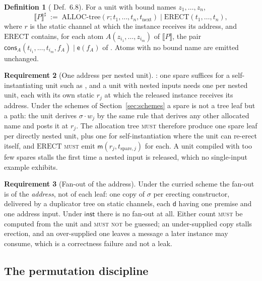 \documentclass[11pt,a4paper]{article}
\newcommand{\MUST}{\textsc{must}}
\newcommand{\MUSTNOT}{\textsc{must not}}
\newcommand{\enc}[1]{\llbracket #1 \rrbracket}
\newcommand{\mm}{\mathsf{m}}
\newcommand{\dd}{\mathsf{d}}
\newcommand{\ev}{\mathsf{e}}
\newcommand{\cons}{\mathsf{cons}}
\newcommand{\ERECT}{\mathrm{ERECT}}
\newcommand{\inst}{\mathsf{inst}}
\theoremstyle{definition}
\newtheorem{definition}{Definition}[section]
\newtheorem{requirement}[definition]{Requirement}
\theoremstyle{plain}
\begin{document}
\begin{definition}[\cite{draft3} Def.~6.8]\label{def:phase2}
For a unit with bound names $z_{1},\dots,z_{n}$,
\[
  \enc{P}^{\sharp} \;:=\;
  \text{ALLOC-tree}(r; t_{1},\dots,t_{n},t_{\mathrm{next}})
  \mid \ERECT(t_{1},\dots,t_{n}),
\]
where $r$ is the static channel at which the instance receives its address,
and $\ERECT$ contains, for each atom $A(z_{i_{1}},\dots,z_{i_{m}})$ of
$\enc{P}$, the pair $\cons_{A}(t_{i_{1}},\dots,t_{i_{m}},f_{A}) \mid \ev(f_{A})$
of \cite[Rem.~3.11]{draft3}. Atoms with no bound name are emitted unchanged.
\end{definition}

\begin{requirement}[One address per nested unit]\label{req:spares}
\cite[Rem.~6.13]{draft3}: one spare suffices for a self-instantiating unit
such as \cite[Ex.~6.9]{draft3}, and a unit with nested inputs needs one per
nested unit, each with its own static $r_{j}$ at which the released instance
receives its address. Under the schemes of Section~\ref{sec:schemes} a spare
is not a tree leaf but a path: the unit derives $\sigma\!\cdot\!w_{j}$ by the
same rule that derives any other allocated name and posts it at $r_{j}$. The allocation tree \MUST{} therefore produce one spare leaf per
directly nested unit, plus one for self-instantiation where the unit can
re-erect itself, and $\ERECT$ \MUST{} emit $\mm(r_{j}, t_{\mathrm{spare},j})$
for each. A unit compiled with too few spares stalls the first time a nested
input is released, which no single-input example exhibits.
\end{requirement}

\begin{requirement}[Fan-out of the address]\label{req:fanout}
Under the curried scheme the fan-out is of the \emph{address}, not of each
leaf: one copy of $\sigma$ per erecting constructor, delivered by a duplicator
tree on static channels, each $\dd$ having one premise and one address input.
Under $\inst$ there is no fan-out at all. Either count \MUST{} be computed
from the unit and \MUSTNOT{} be guessed; an under-supplied copy stalls
erection, and an over-supplied one leaves a message a later instance may
consume, which is a correctness failure and not a leak.
\end{requirement}

\subsection{The permutation discipline}\label{sec:discipline}
\end{document}
